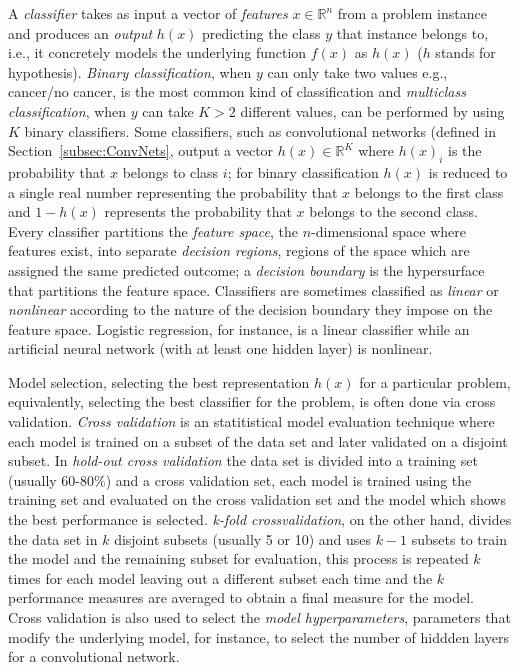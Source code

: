 A \emph{classifier} takes as input a vector of \emph{features} $x \in \mathbb{R}^n$ from a problem instance and produces an \emph{output} $h(x)$ predicting the class $y$ that instance belongs to, i.e., it concretely models the underlying function $f(x)$ as $h(x)$ ($h$ stands for hypothesis). \emph{Binary classification}, when $y$ can only take two values e.g., cancer/no cancer, is the most common kind of classification and \emph{multiclass classification}, when $y$ can take $K > 2$ different values, can be performed by using $K$ binary classifiers. Some classifiers, such as convolutional networks (defined in Section~\ref{subsec:ConvNets}, output a vector $h(x) \in \mathbb{R}^K$ where $h(x)_i$ is the probability that $x$ belongs to class $i$; for binary classification $h(x)$ is reduced to a single real number representing the probability that $x$ belongs to the first class and $1-h(x)$ represents the probability that $x$ belongs to the second class. Every classifier partitions the \emph{feature space}, the $n$-dimensional space where features exist, into separate \emph{decision regions}, regions of the space which are assigned the same predicted outcome; a \emph{decision boundary} is the hypersurface that partitions the feature space. Classifiers are sometimes classified as \emph{linear} or \emph{nonlinear} according to the nature of the decision boundary they impose on the feature space. Logistic regression, for instance, is a linear classifier while an artificial neural network (with at least one hidden layer) is nonlinear.

Model selection, selecting the best representation $h(x)$ for a particular problem, equivalently, selecting the best classifier for the problem, is often done via cross validation. \emph{Cross validation} is an statitistical model evaluation technique where each model is trained on a subset of the data set and later validated on a disjoint subset. In \emph{hold-out cross validation} the data set is divided into a training set (usually 60-80\%) and a cross validation set, each model is trained using the training set and evaluated on the cross validation set and the model which shows the best performance is selected. \emph{k-fold crossvalidation}, on the other hand, divides the data set in $k$ disjoint subsets (usually 5 or 10) and uses $k-1$ subsets to train the model and the remaining subset for evaluation, this process is repeated $k$ times for each model leaving out a different subset each time and the $k$ performance measures are averaged to obtain a final measure for the model. Cross validation is also used to select the \emph{model hyperparameters}, parameters that modify the underlying model, for instance, to select the number of hiddden layers for a convolutional network.

